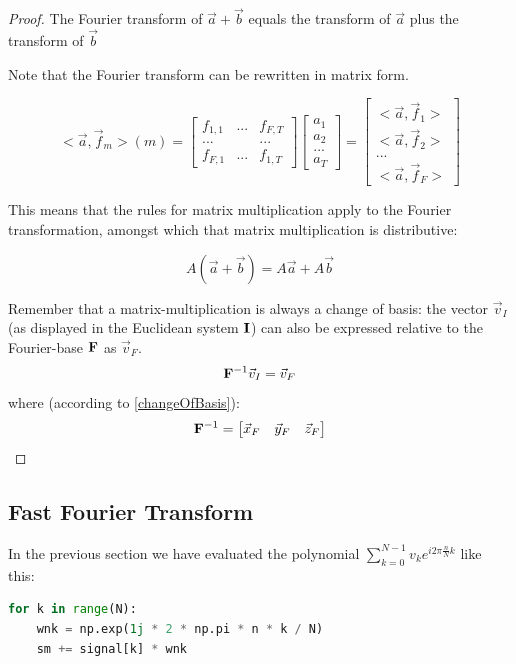 \begin{proof}
    The Fourier transform of $\vec{a} + \vec{b}$ equals the transform of $\vec{a}$ plus the transform of $\vec{b}$

    Note that the Fourier transform can be rewritten in matrix form. 
    
    $$
    <\vec{a}, \vec{f}_m>(m) = 
    \begin{bmatrix} f_{1,1} & ... & f_{F,T} \\ ... & & ... \\ f_{F,1} & ... & f_{1,T}  \end{bmatrix} 
    \begin{bmatrix} a_1 \\ a_2 \\ ... \\ a_T \end{bmatrix}  
    = 
    \begin{bmatrix} <\vec{a}, \vec{f}_1> \\ <\vec{a}, \vec{f}_2> \\ ...  \\ <\vec{a}, \vec{f}_F> \end{bmatrix} 
    $$
    
    This means that the rules for matrix multiplication apply to the Fourier transformation, amongst which that matrix multiplication is distributive:
    
    $$ A (\vec{a} + \vec{b}) = A \vec{a} + A \vec{b} $$
    
    Remember that a matrix-multiplication is always a change of basis:
    the vector $\vec{v}_I$ (as displayed in the Euclidean system $\mathbf{I}$) can also be expressed
    relative to the Fourier-base $\mathbf{F}$ as $\vec{v}_F$. 
    $$ \mathbf{F}^{-1} \vec{v}_I = \vec{v}_F $$
    where (according to \ref{changeOfBasis}): 
    $$ \mathbf{F}^{-1} = \begin{bmatrix} \vec{x}_F & \vec{y}_F & \vec{z}_F \end{bmatrix} $$
    
\end{proof}


\subsection{Fast Fourier Transform}

In the previous section we have evaluated the polynomial $\sum_{k=0}^{N-1} v_k e^{i 2 \pi \frac{n}{N} k}$ like this:
\begin{lstlisting}[language=python]
for k in range(N):
    wnk = np.exp(1j * 2 * np.pi * n * k / N) 
    sm += signal[k] * wnk
\end{lstlisting}


